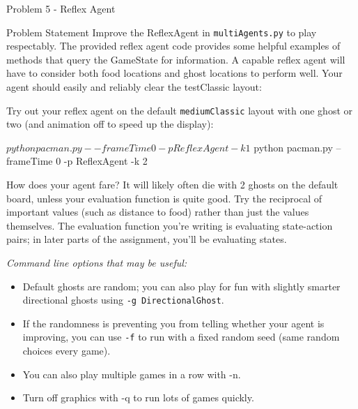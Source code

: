 \begin{problem}{Problem 5 - Reflex Agent}
    \begin{statement}{Problem Statement}
        Improve the ReflexAgent in \texttt{multiAgents.py} to play respectably. The provided reflex agent code provides some helpful examples of methods that query the GameState for information. A capable 
        reflex agent will have to consider both food locations and ghost locations to perform well. Your agent should easily and reliably clear the testClassic layout:


        Try out your reflex agent on the default \texttt{mediumClassic} layout with one ghost or two (and animation off to speed up the display):

    \begin{code}[Bash]
    $ python pacman.py --frameTime 0 -p ReflexAgent -k 1
    $ python pacman.py --frameTime 0 -p ReflexAgent -k 2
    \end{code}

        How does your agent fare? It will likely often die with 2 ghosts on the default board, unless your evaluation function is quite good. Try the reciprocal of important values (such as distance to food) 
        rather than just the values themselves. The evaluation function you're writing is evaluating state-action pairs; in later parts of the assignment, you'll be evaluating states.

        \textit{Command line options that may be useful:}

        \begin{itemize}
            \item Default ghosts are random; you can also play for fun with slightly smarter directional ghosts using \texttt{-g DirectionalGhost}.
            \item If the randomness is preventing you from telling whether your agent is improving, you can use \texttt{-f} to run with a fixed random seed (same random choices every game).
            \item You can also play multiple games in a row with -n.
            \item Turn off graphics with -q to run lots of games quickly.
        \end{itemize}
        

\end{statement}
\end{problem}

